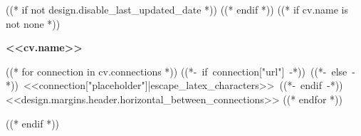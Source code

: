 ((* if not design.disable_last_updated_date *))
\placelastupdatedtext
((* endif *))
((* if cv.name is not none *))
\begin{header}
    \textbf{\fontsize{<<design.header_font_size>>}{<<design.header_font_size>>}\selectfont <<cv.name>>}

    \vspace{<<design.margins.header.vertical_between_name_and_connections>>}

    \normalsize
    ((* for connection in cv.connections *))
    \mbox{((*- if connection["url"] -*))
        ((*- else -*))
        {\color{black}{\footnotesize<<connection["latex_icon"]>>}\hspace*{0.13cm}<<connection["placeholder"]|escape_latex_characters>>}
        ((*- endif -*))}
    \kern <<design.margins.header.horizontal_between_connections>>
    ((* endfor *))
\end{header}

\vspace{<<design.margins.header.bottom>> - <<design.margins.section_title.top>>}
((* endif *))